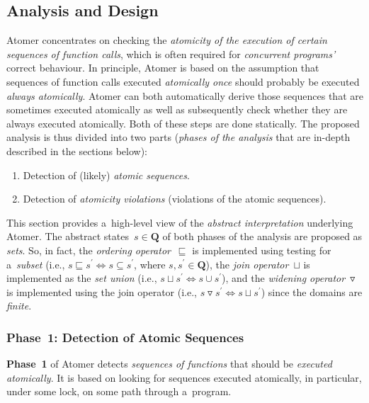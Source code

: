 \documentclass{ExcelAtFIT}
\theoremstyle{example}
\begin{document}
\subsection{Analysis and Design}

Atomer concentrates on checking the \emph{atomicity of the execution of certain sequences of function calls}, which is often required for \emph{concurrent programs'} correct behaviour. In principle, Atomer is based on the assumption that sequences of function calls executed \emph{atomically once} should probably be executed \emph{always atomically}. Atomer can both automatically derive those sequences that are sometimes executed atomically as well as subsequently check whether they are always executed atomically. Both of these steps are done statically. The proposed analysis is thus divided into two parts (\emph{phases of the analysis} that are in-depth described in the sections below):
\begin{enumerate}[label={\textbf{Phase~\arabic*}:}, leftmargin=4.2em]
    \item Detection of (likely) \emph{atomic sequences}.

    \item Detection of \emph{atomicity violations} (violations of the atomic sequences).
\end{enumerate}

This section provides a~high-level view of the \emph{abstract interpretation} underlying Atomer. The abstract states~$ s \in \boldsymbol{Q} $ of both phases of the analysis are proposed as \emph{sets}. So, in fact, the \emph{ordering operator}~$ \sqsubseteq $ is implemented using testing for a~\emph{subset} (i.e., $ s \sqsubseteq s^\prime \Leftrightarrow s \subseteq s^\prime $, where $ s, s^\prime \in \boldsymbol{Q} $), the \emph{join operator}~$ \sqcup $ is implemented as the \emph{set union} (i.e., $ s \sqcup s^\prime \Leftrightarrow s \cup s^\prime $), and the \emph{widening operator}~$ \triangledown $ is implemented using the join operator (i.e., $ s \triangledown s^\prime \Leftrightarrow s \sqcup s^\prime $) since the domains are \emph{finite}.

\subsubsection{Phase~1: Detection of Atomic Sequences}

\textbf{Phase~1} of Atomer detects \emph{sequences of functions} that should be \emph{executed atomically}. It is based on looking for sequences executed atomically, in particular, under some lock, on some path through a~program.
\end{document}
